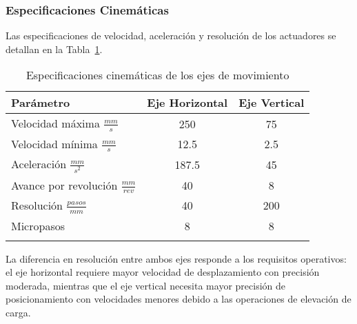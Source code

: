 \subsubsection{Especificaciones Cinemáticas}

Las especificaciones de velocidad, aceleración y resolución de los actuadores se detallan en la Tabla~\ref{tab:especificaciones_cinematicas}.

\begin{table}[htbp]
\centering
\caption{Especificaciones cinemáticas de los ejes de movimiento}
\label{tab:especificaciones_cinematicas}
\begin{tabular}{|l|c|c|}
\hline
\textbf{Parámetro} & \textbf{Eje Horizontal} & \textbf{Eje Vertical} \\ \hline
Velocidad máxima \(\frac{mm}{s}\) & 250 & 75 \\ \hline
Velocidad mínima \(\frac{mm}{s}\) & 12.5 & 2.5 \\ \hline
Aceleración \(\frac{mm}{s^2}\) & 187.5 & 45 \\ \hline
Avance por revolución \(\frac{mm}{rev}\) & 40 & 8 \\ \hline
Resolución \(\frac{pasos}{mm}\) & 40 & 200 \\ \hline
Micropasos & 8 & 8 \\ \hline
\multicolumn{3}{c}{} \\
\end{tabular}
\end{table}

La diferencia en resolución entre ambos ejes responde a los requisitos operativos: el eje horizontal requiere mayor velocidad de desplazamiento con precisión moderada, mientras que el eje vertical necesita mayor precisión de posicionamiento con velocidades menores debido a las operaciones de elevación de carga.